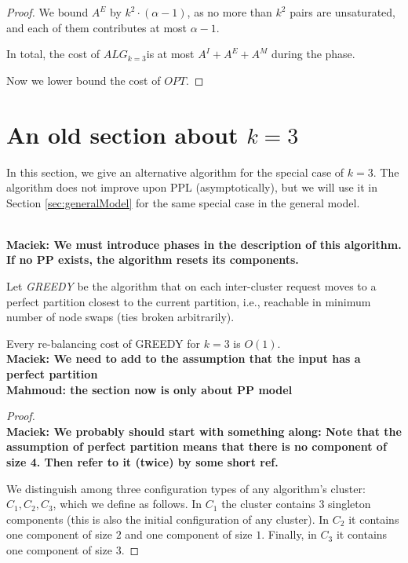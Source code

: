 \documentclass[manuscript,screen=true]{acmart}
\newcommand{\OPT}{\mathit{OPT}}
\newcommand{\TAlg}{{\ensuremath{ALG_{k=3}}}} %
\newcommand\mahmoud[1]{\color{green}\textbf{\\ Mahmoud: #1}\\\color{black}}
\newcommand\maciek[1]{\color{brown}\textbf{\\ Maciek: #1}\color{black}}
\begin{document}
\begin{appendix}
\begin{proof}
    We bound $A^E$ by $k^2 \cdot (\alpha - 1)$, as no more than $k^2$ pairs are unsaturated, and each of them contributes at most $\alpha -1$.

    In total, the cost of \TAlg is at most $A^I + A^E + A^M$ during the phase.

    Now we lower bound the cost of $\OPT$.
  \end{proof}
  

  \section{An old section about $k=3$}

  \label{sec:k3}
  In this section,
  we give an alternative algorithm for the special case of $k=3$.
  The algorithm does not  improve upon PPL (asymptotically),
  but we will use it in Section \ref{sec:generalModel} for the same special case in the general model.
  
  \maciek{We must introduce phases in the description of this algorithm. If no PP exists, the algorithm resets its components.}
  
  Let \emph{GREEDY} be the algorithm that on each inter-cluster request
   moves to a perfect partition
  closest to the current partition,
  i.e.,
  reachable in minimum number of node swaps (ties broken arbitrarily).
  
  \begin{lemma} \label{lemma:k=3}
    Every re-balancing cost of GREEDY for $k=3$ is $O(1)$.
    \maciek{We need to add to the assumption that the input has a perfect partition
    \mahmoud{the section now is only about PP model}}
    \label{rebalancing-cost}
  \end{lemma}
  
  \begin{proof} 
  
    \maciek{We probably should start with something along: Note that the assumption of perfect partition means that there is no component of size 4. Then refer to it (twice) by some short ref.}
    
    We distinguish among three configuration types of any algorithm's cluster: $C_1, C_2, C_3$, which we define as follows. In $C_1$ the cluster contains $3$ singleton components (this is also the initial configuration of any cluster). In $C_2$ it contains one component of size $2$ and one component of size $1$. Finally, in $C_3$ it contains one component of size $3$.
  

\end{proof}
\end{appendix}
\end{document}
